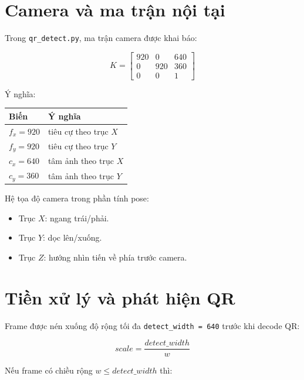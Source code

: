 \documentclass[12pt,a4paper]{article}
\begin{document}
\section{Camera và ma trận nội tại}

Trong \texttt{qr\_detect.py}, ma trận camera được khai báo:

\begin{equation}
K =
\begin{bmatrix}
920 & 0 & 640 \\
0 & 920 & 360 \\
0 & 0 & 1
\end{bmatrix}
\end{equation}

Ý nghĩa:

\begin{longtable}{|>{\raggedright\arraybackslash}p{4cm}|>{\raggedright\arraybackslash}p{9cm}|}
\hline
Biến & Ý nghĩa \\ \hline
$f_x = 920$ & tiêu cự theo trục $X$ \\ \hline
$f_y = 920$ & tiêu cự theo trục $Y$ \\ \hline
$c_x = 640$ & tâm ảnh theo trục $X$ \\ \hline
$c_y = 360$ & tâm ảnh theo trục $Y$ \\ \hline
\end{longtable}

Hệ tọa độ camera trong phần tính pose:

\begin{itemize}
    \item Trục $X$: ngang trái/phải.
    \item Trục $Y$: dọc lên/xuống.
    \item Trục $Z$: hướng nhìn tiến về phía trước camera.
\end{itemize}

\section{Tiền xử lý và phát hiện QR}

Frame được nén xuống độ rộng tối đa \texttt{detect\_width = 640} trước khi decode QR:

\begin{equation}
scale = \frac{detect\_width}{w}
\end{equation}

Nếu frame có chiều rộng $w \le detect\_width$ thì:
\end{document}
